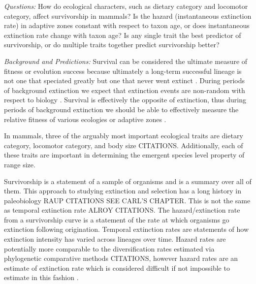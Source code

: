 \documentclass[12pt,letterpaper]{article}
\begin{document}
\textit{Questions:} How do ecological characters, such as dietary category and locomotor category, affect survivorship in mammals? Is the hazard (instantaneous extinction rate) in adaptive zones constant with respect to taxon age, or does instantaneous extinction rate change with taxon age? Is any single trait the best predictor of survivorship, or do multiple traits together predict survivorship better?

\textit{Background and Predictions:} 
Survival can be considered the ultimate measure of fitness or evolution success \citep{Cooper1984,Palmer2012} because ultimately a long-term successful lineage is not one that speciated greatly but one that never went extinct \citep{Palmer2012}. During periods of background extinction we expect that extinction events are non-random with respect to biology \citep{Jablonski1986}. Survival is effectively the opposite of extinction, thus during periods of background extinction we should be able to effectively measure the relative fitness of various ecologies or adaptive zones \citep{Simpson1944,Kitchell1990,Kitchell1985a,VanValen1973}.

In mammals, three of the arguably most important ecological traits are dietary category, locomotor category, and body size CITATIONS. Additionally, each of these traits are important in determining the emergent species level property of range size. 



Survivorship is a statement of a sample of organisms and is a summary over all of them. This approach to studying extinction and selection has a long history in paleobiology \citep{Simpson1944,VanValen1979,Foote1988,Baumiller1993,Kitchell1987b,Kitchell1990} RAUP CITATIONS SEE CARL'S CHAPTER. This is not the same as temporal extinction rate \citep{Foote2000,Foote2000a} ALROY CITATIONS. The hazard/extinction rate from a survivorship curve is a statement of the rate at which organisms go extinction following origination. Temporal extinction rates are statements of how extinction intensity has varied across lineages over time. Hazard rates are potentially more comparable to the diversification rates estimated via phylogenetic comparative methods CITATIONS, however hazard rates are an estimate of extinction rate which is considered difficult if not impossible to estimate in this fashion \citep{Rabosky2010a}.
\end{document}
